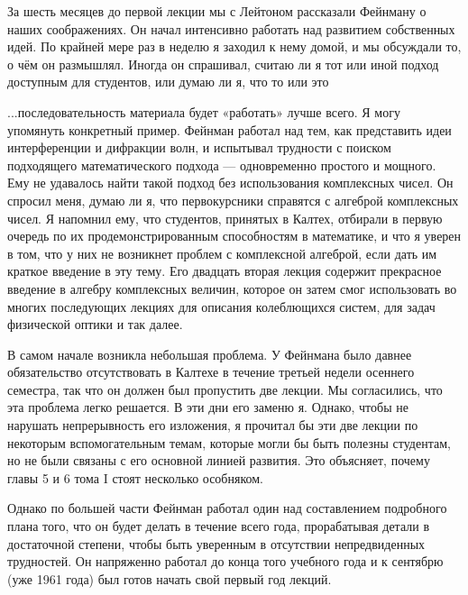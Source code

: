 \documentclass[11pt,oneside]{article}
\begin{document}
За шесть месяцев до первой лекции мы с Лейтоном рассказали Фейнману о наших соображениях. Он начал интенсивно работать над развитием собственных идей. По крайней мере раз в неделю я заходил к нему домой, и мы обсуждали то, о чём он размышлял. Иногда он спрашивал, считаю ли я тот или иной подход доступным для студентов, или думаю ли я, что то или это\par



...последовательность материала будет «работать» лучше всего. Я могу упомянуть конкретный пример. Фейнман работал над тем, как представить идеи интерференции и дифракции волн, и испытывал трудности с поиском подходящего математического подхода --- одновременно простого и мощного. Ему не удавалось найти такой подход без использования комплексных чисел. Он спросил меня, думаю ли я, что первокурсники справятся с алгеброй комплексных чисел. Я напомнил ему, что студентов, принятых в Калтех, отбирали в первую очередь по их продемонстрированным способностям в математике, и что я уверен в том, что у них не возникнет проблем с комплексной алгеброй, если дать им краткое введение в эту тему. Его двадцать вторая лекция содержит прекрасное введение в алгебру комплексных величин, которое он затем смог использовать во многих последующих лекциях для описания колеблющихся систем, для задач физической оптики и так далее.\par



В самом начале возникла небольшая проблема. У Фейнмана было давнее обязательство отсутствовать в Калтехе в течение третьей недели осеннего семестра, так что он должен был пропустить две лекции. Мы согласились, что эта проблема легко решается. В эти дни его заменю я. Однако, чтобы не нарушать непрерывность его изложения, я прочитал бы эти две лекции по некоторым вспомогательным темам, которые могли бы быть полезны студентам, но не были связаны с его основной линией развития. Это объясняет, почему главы 5 и 6 тома I стоят несколько особняком.\par



Однако по большей части Фейнман работал один над составлением подробного плана того, что он будет делать в течение всего года, прорабатывая детали в достаточной степени, чтобы быть уверенным в отсутствии непредвиденных трудностей. Он напряженно работал до конца того учебного года и к сентябрю (уже 1961 года) был готов начать свой первый год лекций.\par
\end{document}
